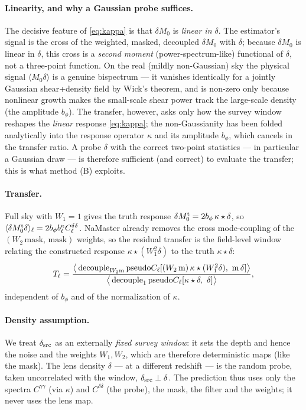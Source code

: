 \documentclass[11pt]{article}
\newcommand{\Wone}{W_1}
\newcommand{\Wtwo}{W_2}
\newcommand{\dt}{\delta}
\begin{document}
\paragraph{Linearity, and why a Gaussian probe suffices.}
The decisive feature of \cref{eq:kappa} is that $\delta M_0$ is \emph{linear in
$\dt$}. The estimator's signal is the cross of the weighted, masked, decoupled
$\delta M_0$ with $\dt$; because $\delta M_0$ is linear in $\dt$, this cross is a
\emph{second moment} (power-spectrum-like) functional of $\dt$, not a
three-point function. On the real (mildly non-Gaussian) sky the physical signal
$\langle M_0\dt\rangle$ is a genuine bispectrum --- it vanishes identically for a
jointly Gaussian shear+density field by Wick's theorem, and is non-zero only
because nonlinear growth makes the small-scale shear power track the large-scale
density (the amplitude $b_\phi$). The transfer, however, asks only how the survey
window reshapes the \emph{linear} response \cref{eq:kappa}; the non-Gaussianity
has been folded analytically into the response operator $\kappa$ and its
amplitude $b_\phi$, which cancels in the transfer ratio. A probe $\dt$ with the
correct two-point statistics --- in particular a Gaussian draw --- is therefore
sufficient (and correct) to evaluate the transfer; this is what method (B)
exploits.

\paragraph{Transfer.}
Full sky with $\Wone=1$ gives the truth response $\delta M_0^{\rm t}=2b_\phi
\,\kappa\star\dt$, so $\langle\delta M_0^{\rm t}\dt\rangle_\ell=2b_\phi
b^\kappa_\ell C^{\dt\dt}_\ell$. NaMaster already removes the cross mode-coupling
of the $(\Wtwo\,\text{mask},\,\text{mask})$ weights, so the residual transfer is
the field-level window relating the constructed response $\kappa\star(\Wone^2\dt)$
to the truth $\kappa\star\dt$:
\begin{equation}
T_\ell=\frac{\big\langle\,\mathrm{decouple}_{\Wtwo{\rm m}}\,
\mathrm{pseudo}C_\ell[(\Wtwo\,{\rm m})\,\kappa\star(\Wone^2\dt),\ {\rm m}\,\dt]\big\rangle}
{\big\langle\,\mathrm{decouple}_{1}\,
\mathrm{pseudo}C_\ell[\kappa\star\dt,\ \dt]\big\rangle},
\label{eq:Tdef}
\end{equation}
independent of $b_\phi$ and of the normalization of $\kappa$.

\paragraph{Density assumption.}
We treat $\delta_{\rm src}$ as an externally \emph{fixed survey window}: it sets
the depth and hence the noise and the weights $\Wone,\Wtwo$, which are therefore
deterministic maps (like the mask). The lens density $\dt$ --- at a different
redshift --- is the random probe, taken uncorrelated with the window,
$\delta_{\rm src}\perp\dt$. The prediction thus uses only the spectra
$C^{\gamma\gamma}$ (via $\kappa$) and $C^{\dt\dt}$ (the probe), the mask, the
filter and the weights; it never uses the lens map.
\end{document}
